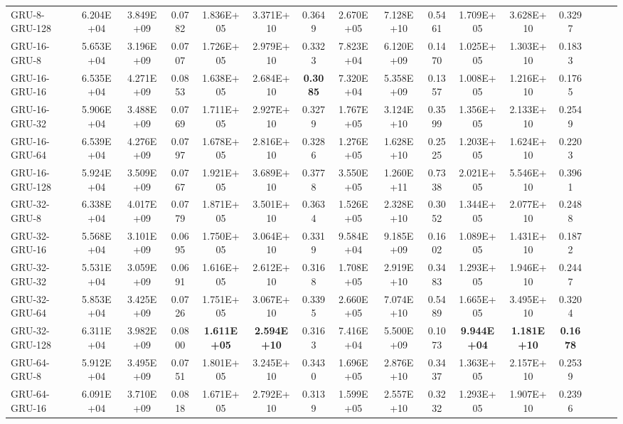 \begin{landscape}
\begin{longtable}{|l|c|c|c|c|c|c|c|c|c|c|c|c|c|c|c|}
    GRU-8-GRU-128 & 6.204E+04 & 3.849E+09 & 0.0782 & 1.836E+05 & 3.371E+10 & 0.3649 & 2.670E+05 & 7.128E+10 & 0.5461 & 1.709E+05 & 3.628E+10 & 0.3297 \\
    GRU-16-GRU-8 & 5.653E+04 & 3.196E+09 & 0.0707 & 1.726E+05 & 2.979E+10 & 0.3323 & 7.823E+04 & 6.120E+09 & 0.1470 & 1.025E+05 & 1.303E+10 & 0.1833 \\
    GRU-16-GRU-16 & 6.535E+04 & 4.271E+09 & 0.0853 & 1.638E+05 & 2.684E+10 & \cellcolor[rgb]{ .573,  .816,  .314}\textbf{0.3085} & 7.320E+04 & 5.358E+09 & 0.1357 & 1.008E+05 & 1.216E+10 & 0.1765 \\
    GRU-16-GRU-32 & 5.906E+04 & 3.488E+09 & 0.0769 & 1.711E+05 & 2.927E+10 & 0.3279 & 1.767E+05 & 3.124E+10 & 0.3599 & 1.356E+05 & 2.133E+10 & 0.2549 \\
    GRU-16-GRU-64 & 6.539E+04 & 4.276E+09 & 0.0797 & 1.678E+05 & 2.816E+10 & 0.3286 & 1.276E+05 & 1.628E+10 & 0.2525 & 1.203E+05 & 1.624E+10 & 0.2203 \\
    GRU-16-GRU-128 & 5.924E+04 & 3.509E+09 & 0.0767 & 1.921E+05 & 3.689E+10 & 0.3778 & 3.550E+05 & 1.260E+11 & 0.7338 & 2.021E+05 & 5.546E+10 & 0.3961 \\
    GRU-32-GRU-8 & 6.338E+04 & 4.017E+09 & 0.0779 & 1.871E+05 & 3.501E+10 & 0.3634 & 1.526E+05 & 2.328E+10 & 0.3052 & 1.344E+05 & 2.077E+10 & 0.2488 \\
    GRU-32-GRU-16 & 5.568E+04 & 3.101E+09 & 0.0695 & 1.750E+05 & 3.064E+10 & 0.3319 & 9.584E+04 & 9.185E+09 & 0.1602 & 1.089E+05 & 1.431E+10 & 0.1872 \\
    GRU-32-GRU-32 & 5.531E+04 & 3.059E+09 & 0.0691 & 1.616E+05 & 2.612E+10 & 0.3168 & 1.708E+05 & 2.919E+10 & 0.3483 & 1.293E+05 & 1.946E+10 & 0.2447 \\
    GRU-32-GRU-64 & 5.853E+04 & 3.425E+09 & 0.0726 & 1.751E+05 & 3.067E+10 & 0.3395 & 2.660E+05 & 7.074E+10 & 0.5489 & 1.665E+05 & 3.495E+10 & 0.3204 \\
    GRU-32-GRU-128 & 6.311E+04 & 3.982E+09 & 0.0800 & \cellcolor[rgb]{ .573,  .816,  .314}\textbf{1.611E+05} & \cellcolor[rgb]{ .573,  .816,  .314}\textbf{2.594E+10} & 0.3163 & 7.416E+04 & 5.500E+09 & 0.1073 & \cellcolor[rgb]{ .573,  .816,  .314}\textbf{9.944E+04} & \cellcolor[rgb]{ .573,  .816,  .314}\textbf{1.181E+10} & \cellcolor[rgb]{ .573,  .816,  .314}\textbf{0.1678} \\
    GRU-64-GRU-8 & 5.912E+04 & 3.495E+09 & 0.0751 & 1.801E+05 & 3.245E+10 & 0.3430 & 1.696E+05 & 2.876E+10 & 0.3437 & 1.363E+05 & 2.157E+10 & 0.2539 \\
    GRU-64-GRU-16 & 6.091E+04 & 3.710E+09 & 0.0818 & 1.671E+05 & 2.792E+10 & 0.3139 & 1.599E+05 & 2.557E+10 & 0.3232 & 1.293E+05 & 1.907E+10 & 0.2396 \\

\end{longtable}
\end{landscape}
